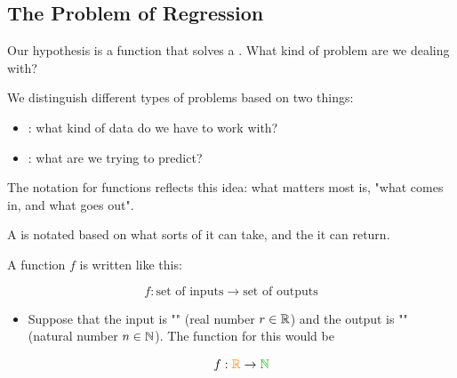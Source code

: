         
        

    \pagebreak
        
    \subsection{The Problem of Regression}
    
        Our hypothesis is a function that solves a . What kind of problem are we dealing with?

        We distinguish different types of problems based on two things: 

        \begin{itemize}
            \item {}: what kind of data do we have to work with?

            \item {}: what are we trying to predict?
        \end{itemize}

        The notation for functions reflects this idea: what matters most is, "what comes in, and what goes out".
            \\
        
        \begin{notation}
            A  is notated based on what sorts of  it can take, and the  it can return. 
            
            A function $f$ is written like this:
            
            \begin{equation*}
                f: \text{set of inputs} \rightarrow \text{set of outputs}
            \end{equation*}
        \end{notation}

        \begin{itemize}
            \item \miniex Suppose that the input is "" (real number $r \in \mathbb R$) and the output is "" (natural number $n \in \mathbb N$). The function for this would be

            \begin{equation*}
                f: \org{\RR} \to \grn{\NN}
            \end{equation*}
        \end{itemize}

